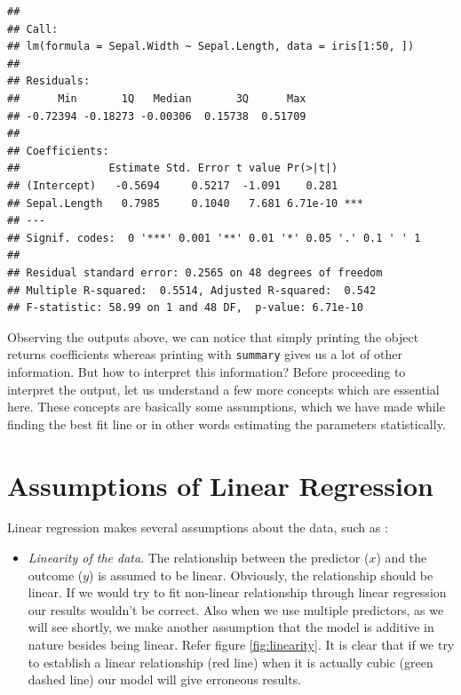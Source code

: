 \documentclass[
]{book}
\providecommand{\tightlist}{%
  \setlength{\itemsep}{0pt}\setlength{\parskip}{0pt}}
\begin{document}
\begin{verbatim}
## 
## Call:
## lm(formula = Sepal.Width ~ Sepal.Length, data = iris[1:50, ])
## 
## Residuals:
##      Min       1Q   Median       3Q      Max 
## -0.72394 -0.18273 -0.00306  0.15738  0.51709 
## 
## Coefficients:
##              Estimate Std. Error t value Pr(>|t|)    
## (Intercept)   -0.5694     0.5217  -1.091    0.281    
## Sepal.Length   0.7985     0.1040   7.681 6.71e-10 ***
## ---
## Signif. codes:  0 '***' 0.001 '**' 0.01 '*' 0.05 '.' 0.1 ' ' 1
## 
## Residual standard error: 0.2565 on 48 degrees of freedom
## Multiple R-squared:  0.5514, Adjusted R-squared:  0.542 
## F-statistic: 58.99 on 1 and 48 DF,  p-value: 6.71e-10
\end{verbatim}

Observing the outputs above, we can notice that simply printing the object returns coefficients whereas printing with \texttt{summary} gives us a lot of other information. But how to interpret this information? Before proceeding to interpret the output, let us understand a few more concepts which are essential here. These concepts are basically some assumptions, which we have made while finding the best fit line or in other words estimating the parameters statistically.

\hypertarget{assumptions-of-linear-regression}{%
\section{Assumptions of Linear Regression}\label{assumptions-of-linear-regression}}

Linear regression makes several assumptions about the data, such as :

\begin{itemize}
\tightlist
\item
  \emph{Linearity of the data}. The relationship between the predictor (\(x\)) and the outcome (\(y\)) is assumed to be linear. Obviously, the relationship should be linear. If we would try to fit non-linear relationship through linear regression our results wouldn't be correct. Also when we use multiple predictors, as we will see shortly, we make another assumption that the model is additive in nature besides being linear. Refer figure \ref{fig:linearity}. It is clear that if we try to establish a linear relationship (red line) when it is actually cubic (green dashed line) our model will give erroneous results.
\end{itemize}
\end{document}
